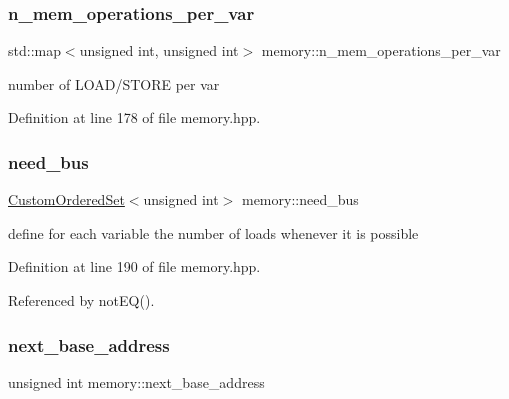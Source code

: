 \subsubsection{\texorpdfstring{n\+\_\+mem\+\_\+operations\+\_\+per\+\_\+var}{n\_mem\_operations\_per\_var}}
{\footnotesize\ttfamily std\+::map$<$unsigned int, unsigned int$>$ memory\+::n\+\_\+mem\+\_\+operations\+\_\+per\+\_\+var\hspace{0.3cm}{\ttfamily [private]}}



number of L\+O\+A\+D/\+S\+T\+O\+RE per var 



Definition at line 178 of file memory.\+hpp.

\mbox{\label{classmemory_aa5d90978b5d5147fa086c0e2f507f415}} 
\subsubsection{\texorpdfstring{need\+\_\+bus}{need\_bus}}
{\footnotesize\ttfamily \hyperlink{classCustomOrderedSet}{Custom\+Ordered\+Set}$<$unsigned int$>$ memory\+::need\+\_\+bus\hspace{0.3cm}{\ttfamily [private]}}



define for each variable the number of loads whenever it is possible 



Definition at line 190 of file memory.\+hpp.



Referenced by not\+E\+Q().

\mbox{\label{classmemory_a74f7fc9e278fc5f1047c06887bfbf628}} 
\subsubsection{\texorpdfstring{next\+\_\+base\+\_\+address}{next\_base\_address}}
{\footnotesize\ttfamily unsigned int memory\+::next\+\_\+base\+\_\+address\hspace{0.3cm}{\ttfamily [private]}}



